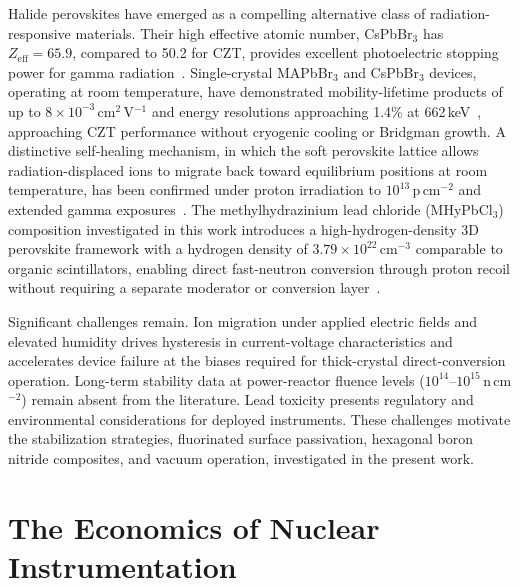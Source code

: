 Halide perovskites have emerged as a compelling alternative class of
radiation-responsive materials. Their high effective atomic number, CsPbBr$_3$
has $Z_\mathrm{eff} = 65.9$, compared to 50.2 for CZT, provides excellent
photoelectric stopping power for gamma radiation~\cite{Springer_CsPbBr3}.
Single-crystal MAPbBr$_3$ and CsPbBr$_3$ devices, operating at room
temperature, have demonstrated
mobility-lifetime products of up to $8 \times 10^{-3}$\,cm$^2$\,V$^{-1}$
and energy resolutions approaching 1.4\% at 662\,keV~\cite{He_NatPhoton_2021},
approaching CZT performance without cryogenic cooling or Bridgman growth.
A distinctive self-healing mechanism, in which the soft perovskite lattice
allows radiation-displaced ions to migrate back toward equilibrium positions
at room temperature, has been confirmed under proton irradiation to
$10^{13}$\,p\,cm$^{-2}$ and extended gamma exposures~\cite{RG_SelfHealing}.
The methylhydrazinium lead chloride (MHyPbCl$_3$) composition investigated
in this work introduces a high-hydrogen-density 3D perovskite framework
with a hydrogen density of $3.79 \times 10^{22}$\,cm$^{-3}$ comparable to
organic scintillators, enabling direct fast-neutron conversion through proton
recoil without requiring a separate moderator or conversion
layer~\cite{Panaccione_NIM_2024}.

Significant challenges remain. Ion migration under applied electric fields
and elevated humidity drives hysteresis in current-voltage characteristics
and accelerates device failure at the biases required for thick-crystal
direct-conversion operation. Long-term stability data at power-reactor
fluence levels ($10^{14}$--$10^{15}$\,n\,cm$^{-2}$) remain absent from the
literature. Lead toxicity presents regulatory and environmental considerations
for deployed instruments. These challenges motivate the stabilization
strategies, fluorinated surface passivation, hexagonal boron nitride
composites, and vacuum operation, investigated in the present work.

\section{The Economics of Nuclear Instrumentation}
\label{sec:intro_economics}

